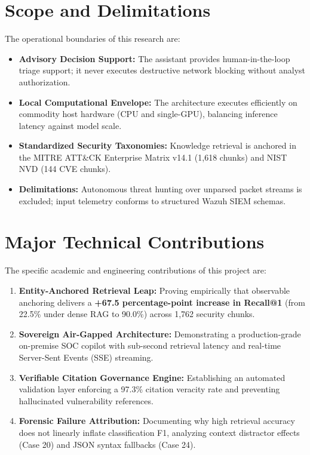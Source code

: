 \section{Scope and Delimitations}
\label{sec:scope}
The operational boundaries of this research are:
\begin{itemize}
  \item \textbf{Advisory Decision Support:} The assistant provides human-in-the-loop triage support; it never executes destructive network blocking without analyst authorization.
  \item \textbf{Local Computational Envelope:} The architecture executes efficiently on commodity host hardware (CPU and single-GPU), balancing inference latency against model scale.
  \item \textbf{Standardized Security Taxonomies:} Knowledge retrieval is anchored in the MITRE ATT\&CK Enterprise Matrix v14.1 (1,618 chunks) and NIST NVD (144 CVE chunks).
  \item \textbf{Delimitations:} Autonomous threat hunting over unparsed packet streams is excluded; input telemetry conforms to structured Wazuh SIEM schemas.
\end{itemize}

\section{Major Technical Contributions}
\label{sec:contributions}
The specific academic and engineering contributions of this project are:
\begin{enumerate}
  \item \textbf{Entity-Anchored Retrieval Leap:} Proving empirically that observable anchoring delivers a \textbf{+67.5 percentage-point increase in Recall@1} (from 22.5\% under dense RAG to 90.0\%) across 1,762 security chunks.
  \item \textbf{Sovereign Air-Gapped Architecture:} Demonstrating a production-grade on-premise SOC copilot with sub-second retrieval latency and real-time Server-Sent Events (SSE) streaming.
  \item \textbf{Verifiable Citation Governance Engine:} Establishing an automated validation layer enforcing a 97.3\% citation veracity rate and preventing hallucinated vulnerability references.
  \item \textbf{Forensic Failure Attribution:} Documenting why high retrieval accuracy does not linearly inflate classification F1, analyzing context distractor effects (Case 20) and JSON syntax fallbacks (Case 24).
\end{enumerate}

